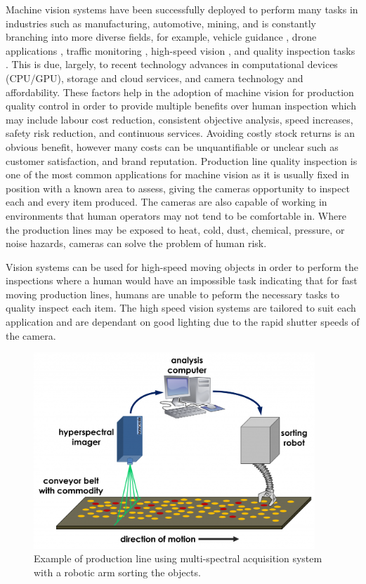 \documentclass[fleqn,twoside,12pt]{report}
\begin{document}
Machine vision systems have been successfully deployed to perform many tasks in industries such as manufacturing, automotive, mining, and is constantly branching into more diverse fields, for example, vehicle guidance \cite{menze,urmson}, drone applications \cite{greene,boucher}, traffic monitoring \cite{cheung,kamijo}, high-speed vision \cite{watanabe,nakabo}, and quality inspection tasks \cite{cubero, du}. This is due, largely, to recent technology advances in computational devices (CPU/GPU), storage and cloud services, and camera technology and affordability. These factors help in the adoption of machine vision for production quality control in order to provide multiple benefits over human inspection which may include labour cost reduction, consistent objective analysis, speed increases, safety risk reduction, and continuous services. Avoiding costly stock returns is an obvious benefit, however many costs can be unquantifiable or unclear such as customer satisfaction, and brand reputation. Production line quality inspection is one of the most common applications for machine vision as it is usually fixed in position with a known area to assess, giving the cameras opportunity to inspect each and every item produced. The cameras are also capable of working in environments that human operators may not tend to be comfortable in. Where the production lines may be exposed to heat, cold, dust, chemical, pressure, or noise hazards, cameras can solve the problem of human risk. 

Vision systems can be used for high-speed moving objects in order to perform the inspections where a human would have an impossible task indicating that for fast moving production lines, humans are unable to peform the necessary tasks to quality inspect each item. The high speed vision systems are tailored to suit each application and are dependant on good lighting due to the rapid shutter speeds of the camera.




\begin{figure}[ht]
	\centering
	\includegraphics[width=300pt]{images/machine_vision.png}
	\caption{Example of production line using multi-spectral acquisition system with a robotic arm sorting the objects.}
	\label{fig:machine_vision}
\end{figure}
\end{document}
